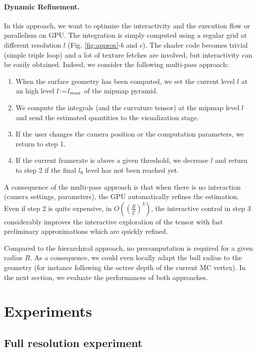\documentclass{llncs}
\begin{document}
\paragraph{Dynamic Refinement.} In this approach, we want to optimize
the interactivity and the execution flow or parallelism on GPU. The
integration is simply computed using a regular grid at different
resolution $l$ (Fig. \ref{fig:approx}-$b$ and $c$). The shader code
becomes trivial (simple triple loop) and a lot of texture fetches are
involved, but interactivity can be easily obtained. Indeed, we
consider the following multi-pass approach:
\begin{enumerate}
\item When the surface geometry has been computed, we set the current
  level $l$ at an high level $l\!\mathrel{\mathop:}=\! l_{max}$ of the mipmap
  pyramid.
\item We compute the integrals (and the curvature tensor) at the
  mipmap level $l$ and  send the estimated quantities to the
  visualization stage.
\item If the user changes the camera position or the computation
  parameters, we return to step 1.
\item If the current framerate is above a given threshold, we decrease
  $l$ and return to step 2 if the final $l_0$ level has not been
  reached yet.
\end{enumerate}
A consequence of the multi-pass approach is that when there is no
interaction (camera settings, parameters), the GPU automatically
refines the estimation. Even if step 2 is quite expensive, in
$O\left(\left(\frac{R}{2^l}\right)^3\right)$, the interactive control
 in step 3 considerably improves the interactive exploration of the
 tensor with fast preliminary approximations which are quickly refined.

 Compared to the hierarchical approach, no precomputation is required
 for a given radius $R$. As a consequence, we could even locally adapt
 the ball radius to the geometry (for instance following the octree
 depth of the current MC vertex). In the next section, we evaluate the
 performances of both approaches.

\section{Experiments}
\label{sec:experiments}

\subsection{Full resolution experiment}
\end{document}
